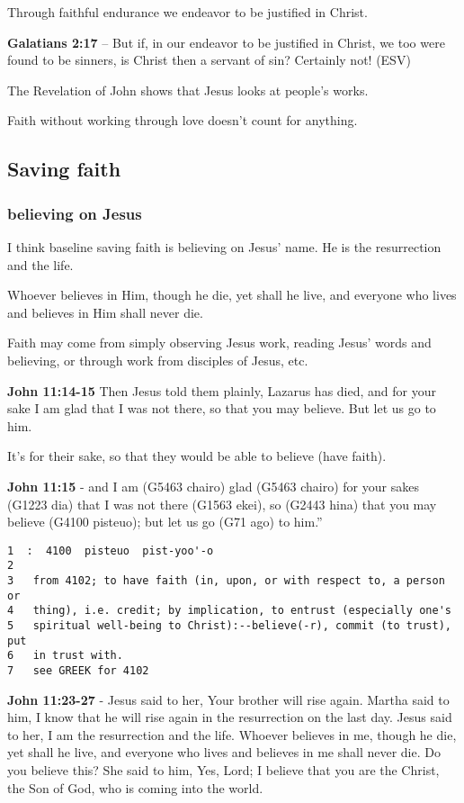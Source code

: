 \documentclass[11pt]{article}
\begin{document}
Through faithful endurance we endeavor to be justified in Christ.

\textbf{Galatians 2:17} -- But if, in our endeavor to be justified in Christ, we too were found to be sinners, is Christ then a servant of sin? Certainly not! (ESV)

The Revelation of John shows that Jesus looks at people's works.

Faith without working through love doesn't count for anything.

\subsection{Saving faith}
\label{sec:org0382f56}
\subsubsection{believing on Jesus}
\label{sec:org182f9ae}
I think baseline saving faith is believing on Jesus' name. He is the resurrection and the life.

Whoever believes in Him, though he die, yet shall he live, and everyone who lives and believes in Him shall never die.

Faith may come from simply observing Jesus work, reading Jesus' words and believing, or through work from disciples of Jesus, etc.

\textbf{John 11:14-15} Then Jesus told them plainly, Lazarus has died, and for your sake I am glad that I was not there, so that you may believe. But let us go to him.

It's for their sake, so that they would be able to believe (have faith).

\textbf{John 11:15} - and I am (G5463 chairo) glad (G5463 chairo) for your sakes (G1223 dia) that I was not there (G1563 ekei), so (G2443 hina) that you may believe (G4100 pisteuo); but let us go (G71 ago) to him.”

\begin{verbatim}
1  :  4100  pisteuo  pist-yoo'-o
2  
3   from 4102; to have faith (in, upon, or with respect to, a person or
4   thing), i.e. credit; by implication, to entrust (especially one's
5   spiritual well-being to Christ):--believe(-r), commit (to trust), put
6   in trust with.
7   see GREEK for 4102
\end{verbatim}

\textbf{John 11:23-27} - Jesus said to her, Your brother will rise again.  Martha said to him, I know that he will rise again in the resurrection on the last day.  Jesus said to her, I am the resurrection and the life. Whoever believes in me, though he die, yet shall he live, and everyone who lives and believes in me shall never die. Do you believe this?  She said to him, Yes, Lord; I believe that you are the Christ, the Son of God, who is coming into the world.
\end{document}
